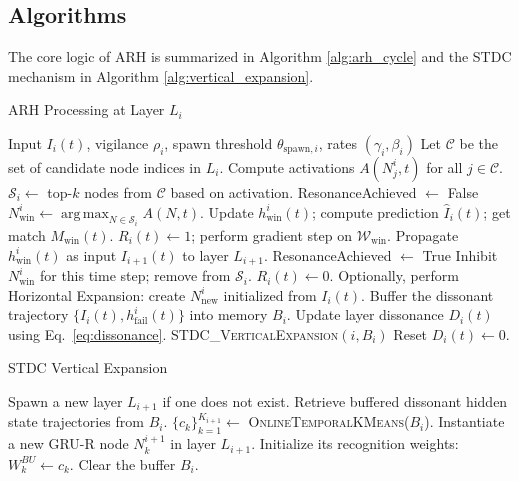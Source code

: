 \documentclass{article}
\DeclareMathOperator*{\argmax}{arg\,max}
\begin{document}
\subsection{Algorithms}
The core logic of ARH is summarized in Algorithm \ref{alg:arh_cycle} and the STDC mechanism in Algorithm \ref{alg:vertical_expansion}.

\begin{algorithm}
\caption{ARH Processing at Layer $L_i$}\label{alg:arh_cycle}
\begin{algorithmic}[1]
\Require Input $I_i(t)$, vigilance $\rho_i$, spawn threshold $\theta_{\text{spawn},i}$, rates $(\gamma_i, \beta_i)$
\State Let $\mathcal{C}$ be the set of candidate node indices in $L_i$.
\State Compute activations $A(N_j^i, t)$ for all $j \in \mathcal{C}$.
\State $\mathcal{S}_i \leftarrow$ top-$k$ nodes from $\mathcal{C}$ based on activation.
\State ResonanceAchieved $\leftarrow$ False
    \State $N_{\text{win}}^i \leftarrow \argmax_{N \in \mathcal{S}_i} A(N, t)$.
    \State Update $h_{\text{win}}^i(t)$; compute prediction $\hat{I}_i(t)$; get match $M_{\text{win}}(t)$.
     
        \State $R_i(t) \leftarrow 1$; perform gradient step on $\mathcal{W}_{\text{win}}$.
        \State Propagate $h_{\text{win}}^i(t)$ as input $I_{i+1}(t)$ to layer $L_{i+1}$.
        \State ResonanceAchieved $\leftarrow$ True
    \Else {}
        \State Inhibit $N_{\text{win}}^i$ for this time step; remove from $\mathcal{S}_i$.
    \EndIf
\EndWhile
{} 
    \State $R_i(t) \leftarrow 0$.
    \State Optionally, perform Horizontal Expansion: create $N_{\text{new}}^i$ initialized from $I_i(t)$.
    \State Buffer the dissonant trajectory $\{I_i(t), h_{\text{fail}}^i(t)\}$ into memory $B_i$.
\EndIf
\State Update layer dissonance $D_i(t)$ using Eq.~\eqref{eq:dissonance}.
 
    \State \textsc{STDC\_VerticalExpansion}$(i, B_i)$
    \State Reset $D_i(t) \leftarrow 0$.
\EndIf
\end{algorithmic}
\end{algorithm}

\begin{algorithm}
\caption{STDC Vertical Expansion}\label{alg:vertical_expansion}
\begin{algorithmic}[1]
    \State Spawn a new layer $L_{i+1}$ if one does not exist.
    \State Retrieve buffered dissonant hidden state trajectories from $B_i$.
    \State $\{c_k\}_{k=1}^{K_{i+1}} \leftarrow$ \textsc{OnlineTemporalKMeans}($B_i$). 
        \State Instantiate a new GRU-R node $N_k^{i+1}$ in layer $L_{i+1}$.
        \State Initialize its recognition weights: $W_k^{BU} \leftarrow c_k$.
    \EndFor
    \State Clear the buffer $B_i$.
\EndProcedure
\end{algorithmic}
\end{algorithm}
\end{document}
